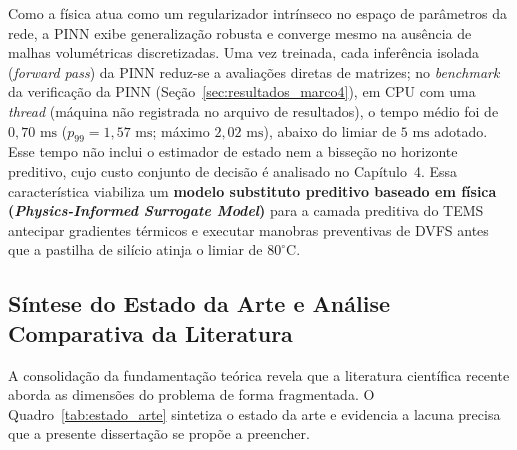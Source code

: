 Como a física atua como um regularizador intrínseco no espaço de parâmetros da rede, a PINN exibe generalização robusta e converge mesmo na ausência de malhas volumétricas discretizadas. Uma vez treinada, cada inferência isolada (\textit{forward pass}) da PINN reduz-se a avaliações diretas de matrizes; no \textit{benchmark} da verificação da PINN (Seção~\ref{sec:resultados_marco4}), em CPU com uma \textit{thread} (máquina não registrada no arquivo de resultados), o tempo médio foi de $0{,}70\text{ ms}$ ($p_{99} = 1{,}57\text{ ms}$; máximo $2{,}02\text{ ms}$), abaixo do limiar de $5\text{ ms}$ adotado. Esse tempo não inclui o estimador de estado nem a bisseção no horizonte preditivo, cujo custo conjunto de decisão é analisado no Capítulo~4. Essa característica viabiliza um \textbf{modelo substituto preditivo baseado em física (\textit{Physics-Informed Surrogate Model})} para a camada preditiva do TEMS antecipar gradientes térmicos e executar manobras preventivas de DVFS antes que a pastilha de silício atinja o limiar de $80^\circ\text{C}$.

\subsection{Síntese do Estado da Arte e Análise Comparativa da Literatura}

A consolidação da fundamentação teórica revela que a literatura científica recente aborda as dimensões do problema de forma fragmentada. O Quadro~\ref{tab:estado_arte} sintetiza o estado da arte e evidencia a lacuna precisa que a presente dissertação se propõe a preencher.


